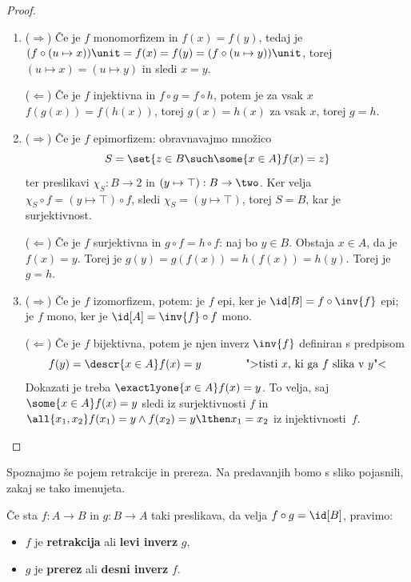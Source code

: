 \begin{proof}
  \begin{enumerate}
  \item ($\Rightarrow$) Če je $f$ monomorfizem in $f(x) = f(y)$, tedaj je
  $(f \circ (u \mapsto x)) \unit = f(x) = f(y) = (f \circ (u \mapsto y)) \unit$, torej
  $(u \mapsto x) = (u \mapsto y)$ in sledi $x = y$.

  ($\Leftarrow$) Če je $f$ injektivna in $f \circ g = f \circ h$, potem je za vsak $x$
  $f(g(x)) = f(h(x))$, torej $g(x) = h(x)$ za vsak $x$, torej $g = h$.

  \item
    ($\Rightarrow$) Če je $f$ epimorfizem: obravnavajmo množico
    \begin{equation*}
      S = \set{ z \in B \such \some{x \in A} f(x) = z }
    \end{equation*}
    ter preslikavi $\chi_S : B \to 2$ in $(y \mapsto \top) : B \to \two$. Ker velja
    $\chi_S \circ f = (y \mapsto \top) \circ f$, sledi $\chi_S = (y \mapsto \top)$, torej $S = B$, kar je surjektivnost.

    ($\Leftarrow$) Če je $f$ surjektivna in $g \circ f = h \circ f$: naj bo $y \in B$. Obstaja $x \in A$, da je $f(x) = y$. Torej je $g(y) = g(f(x)) = h(f(x)) = h(y)$.
    Torej je $g = h$.

  \item ($\Rightarrow$) Če je $f$ izomorfizem, potem:
    je $f$ epi, ker je $\id[B] = f \circ \inv{f}$ epi;
    je $f$ mono, ker je $\id[A] = \inv{f} \circ f$ mono.

    ($\Leftarrow$) Če je $f$ bijektivna, potem je njen inverz $\inv{f}$ definiran s predpisom
    \begin{equation*}
      f(y) = \descr{x \in A} f(x) = y \qquad\qquad
      \text{">tisti $x$, ki ga $f$ slika v $y$"<}
    \end{equation*}
    Dokazati je treba $\exactlyone{x \in A} f(x) = y$.
    To velja, saj $\some{x \in A} f(x) = y$ sledi iz surjektivnosti $f$ in
    $\all{x_1, x_2} f(x_1) = y \land f(x_2) = y \lthen x_1 = x_2$ iz injektivnosti~$f$.
  \end{enumerate}
\end{proof}

Spoznajmo še pojem retrakcije in prereza. Na predavanjih bomo s sliko pojasnili, zakaj se tako imenujeta.

\begin{definicija}
  Če sta $f : A \to B$ in $g : B \to A$ taki preslikava, da velja $f \circ g = \id[B]$, pravimo:
  \begin{itemize}
  \item $f$ je \textbf{retrakcija} ali \textbf{levi inverz} $g$,
  \item $g$ je \textbf{prerez} ali \textbf{desni inverz} $f$.
  \end{itemize}
\end{definicija}

